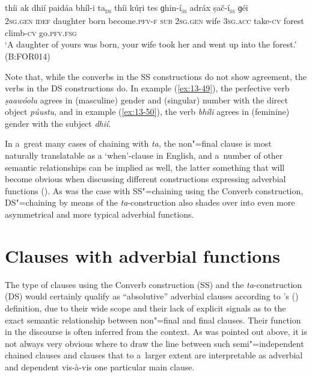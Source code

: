 \ex
\label{ex:13-50}
\gll {\ob}thíi ak dhií paidáa bhíl-i ta{\cb}\textsc{\textsubscript{\upshape ds}} {\ob}thíi kúṛi tes ɡhin-í{\cb}\textsc{\textsubscript{\upshape ss}} {\ob}adráx ṣač-í{\cb}\textsc{\textsubscript{\upshape ss}} ɡéi \\
\textsc{2sg.gen} \textsc{idef} daughter born become.\textsc{pfv-f} \textsc{sub} \textsc{2sg.gen}  wife \textsc{3sg.acc} take-\textsc{cv} forest climb-\textsc{cv} go.\textsc{pfv.fsg} \\
\glt `A daughter of yours was born, your wife took her and went up into the forest.' (B:FOR014) 
\z

Note that, while the converbs in the SS constructions do not show agreement, the verbs in the DS constructions do. In example (\ref{ex:13-49}), the perfective verb \textit{ṣaawóolu} agrees in (masculine) gender and (singular) number with the direct object \textit{púustu}, and in example (\ref{ex:13-50}), the verb \textit{bhíli} agrees in (feminine) gender with the subject \textit{dhií}. 


In a~great many cases of chaining with \textit{ta,} the non"=final clause is most naturally translatable as a `when'-clause in English, and a~number of other semantic relationships can be implied as well, the latter something that will become obvious when discussing different constructions expressing adverbial functions (). As was the case with SS"=chaining using the Converb construction, DS"=chaining by means of the \textit{ta}-construction also shades over into even more asymmetrical and more typical adverbial functions. 


\section{Clauses with adverbial functions}
\label{sec:13-4}

The type of clauses using the Converb construction (SS) and the \textit{ta}-construction (DS) would certainly qualify as ``absolutive'' adverbial clauses according to \citeauthor{thompsonetal2007}'s (\citeyear[264--266]{thompsonetal2007}) definition, due to their wide scope and their lack of explicit signals as to the exact semantic relationship between non"=final and final clauses. Their function in the discourse is often inferred from the context. As was pointed out above, it is not always very obvious where to draw the line between such semi"=independent chained clauses and clauses that to a~larger extent are interpretable as adverbial and dependent vis-à-vis one particular main clause. 



